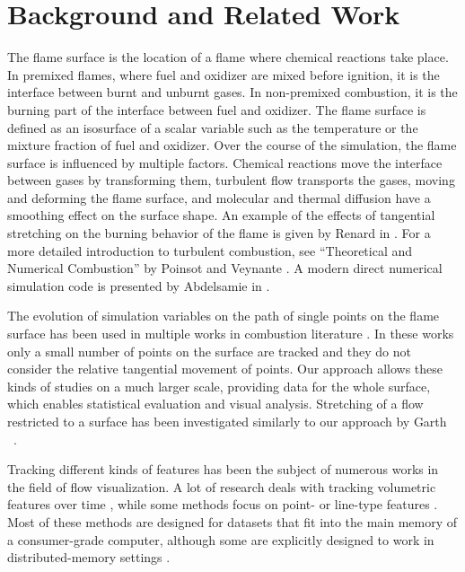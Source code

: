
%
\section{Background and Related Work} %
\label{sec:fst_background_and_related_work}
%
The flame surface is the location of a flame where chemical reactions take
place.
%
In premixed flames, where fuel and oxidizer are mixed before ignition, it is the
interface between burnt and unburnt gases.
%
In non-premixed combustion, it is the burning part of the interface between
fuel and oxidizer.
%
The flame surface is defined as an isosurface of a scalar variable such as the
temperature or the mixture fraction of fuel and oxidizer.
%
Over the course of the simulation, the flame surface is influenced by multiple
factors.
%
Chemical reactions move the interface between gases by transforming them,
turbulent flow transports the gases, moving and deforming the flame surface,
and molecular and thermal diffusion have a smoothing effect on the surface
shape.
%
An example of the effects of tangential stretching on the burning behavior of
the flame is given by Renard \etal in \cite{Renard1999}.
%
For a more detailed introduction to turbulent combustion, see ``Theoretical and
Numerical Combustion'' by Poinsot and Veynante \cite{Poinsot2012}.
%
A modern direct numerical simulation code is presented by Abdelsamie \etal in
\cite{Abdelsamie2016}.
%

%
The evolution of simulation variables on the path of single points on the flame
surface has been used in multiple works in combustion literature
\cite{Sripakagorn2004,Scholtissek2017}.
%
In these works only a small number of points on the surface are tracked and they
do not consider the relative tangential movement of points.
%
Our approach allows these kinds of studies on a much larger scale, providing
data for the whole surface, which enables statistical evaluation and visual
analysis.
%
Stretching of a flow restricted to a surface has been investigated similarly to
our approach by Garth \etal~\cite{Garth2008}.
%

%
Tracking different kinds of features has been the subject of numerous works in
the field of flow visualization.
%
A lot of research deals with tracking volumetric features over time
\cite{Silver1997,Sauer2014,Clyne2013,Mascarenhas2009,Duque2012,Muelder2009},
while some methods focus on point-\cite{Garth2004,Theisel2003a} or line-type
features \cite{Bremer2010}.
%
Most of these methods are designed for datasets that fit into the main memory of
a consumer-grade computer, although some are explicitly designed to work in
distributed-memory settings \cite{Wang2013}.
%

